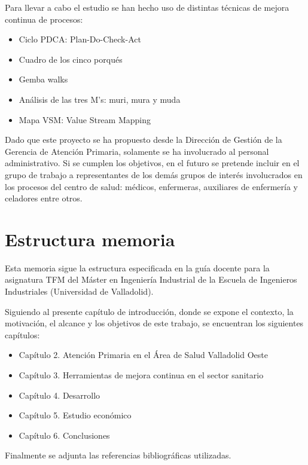 Para llevar a cabo el estudio se han hecho uso de distintas técnicas de mejora continua de procesos:
\begin{itemize}
    \item Ciclo PDCA: Plan-Do-Check-Act
    \item Cuadro de los cinco porqués
    \item Gemba walks
    \item Análisis de las tres M's: muri, mura y muda
    \item Mapa VSM: Value Stream Mapping
\end{itemize}

Dado que este proyecto se ha propuesto desde la Dirección de Gestión de la Gerencia de Atención Primaria, solamente se ha involucrado al personal administrativo. Si se cumplen los objetivos, en el futuro se pretende incluir en el grupo de trabajo a representantes de los demás grupos de interés involucrados en los procesos del centro de salud: médicos, enfermeras, auxiliares de enfermería y celadores entre otros.

\section{Estructura memoria}

Esta memoria sigue la estructura especificada en la guía docente para la asignatura TFM del Máster en Ingeniería Industrial de la Escuela de Ingenieros Industriales (Universidad de Valladolid).

Siguiendo al presente capítulo de introducción, donde se expone el contexto, la motivación, el alcance y los objetivos de este trabajo, se encuentran los siguientes capítulos:

\begin{itemize}
    \item Capítulo 2. Atención Primaria en el Área de Salud Valladolid Oeste
    \item Capítulo 3. Herramientas de mejora continua en el sector sanitario
    \item Capítulo 4. Desarrollo
    \item Capítulo 5. Estudio económico
    \item Capítulo 6. Conclusiones
\end{itemize}

Finalmente se adjunta las referencias bibliográficas utilizadas.
